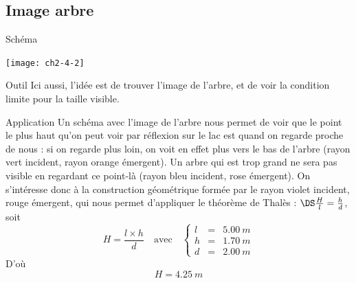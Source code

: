 \documentclass[../main/main.tex]{subfiles}
\begin{document}
\subsection{Image arbre}
\begin{tcbraster}[raster columns=2, raster equal height=rows]
    \begin{NCdefi}{Schéma}
        \begin{center}
            \texttt{[image: ch2-4-2]}
        \end{center}
    \end{NCdefi}
    \begin{tcolorbox}[blankest, raster multicolumn=1, space to=\myspace]
        \begin{tcbraster}[raster columns=1]
            \begin{NCdemo}[add to natural height=\myspace]{Outil}
                Ici aussi, l'idée est de trouver l'image de l'arbre, et de voir
                la condition limite pour la taille visible.
            \end{NCdemo}
            \begin{NCexem}{Application}
                Un schéma avec l'image de l'arbre nous permet de voir que le
                point le plus haut qu'on peut voir par réflexion sur le lac est
                quand on regarde proche de nous : si on regarde plus loin, on
                voit en effet plus vers le bas de l'arbre (rayon vert incident,
                rayon orange émergent). Un arbre qui est trop grand ne sera pas
                visible en regardant ce point-là (rayon bleu incident, rose
                émergent). On s'intéresse donc à la construction géométrique
                formée par le rayon violet incident, rouge émergent, qui nous
                permet d'appliquer le théorème de Thalès : $\DS\frac{H}{l} =
                \frac{h}{d}$, soit
                \[\boxed{H = \frac{l\times h}{d}} \quad \text{avec} \quad
                    \left\{
                        \begin{array}{rcl}
                            l & = & \SI{5.00}{m}\\
                            h & = & \SI{1.70}{m}\\
                            d & = & \SI{2.00}{m}
                        \end{array}
                \right.\]
                D'où
                \[\boxed{H = \SI{4.25}{m}}\]
            \end{NCexem}
        \end{tcbraster}
    \end{tcolorbox}
\end{tcbraster}
\end{document}
